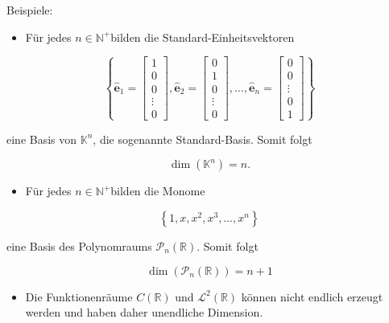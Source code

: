 \documentclass[10pt]{article}
\begin{document}
Beispiele:

\begin{itemize}
  \item Für jedes $n \in \mathbb{N}^{+}$bilden die Standard-Einheitsvektoren
\end{itemize}

\[
\left\{\hat{\mathbf{e}}_{1}=\left[\begin{array}{c}
1  \tag{7.23}\\
0 \\
0 \\
\vdots \\
0
\end{array}\right], \hat{\mathbf{e}}_{2}=\left[\begin{array}{c}
0 \\
1 \\
0 \\
\vdots \\
0
\end{array}\right], \ldots, \hat{\mathbf{e}}_{n}=\left[\begin{array}{c}
0 \\
0 \\
\vdots \\
0 \\
1
\end{array}\right]\right\}
\]

eine Basis von $\mathbb{K}^{n}$, die sogenannte Standard-Basis. Somit folgt


\begin{equation*}
\operatorname{dim}\left(\mathbb{K}^{n}\right)=n . \tag{7.24}
\end{equation*}


\begin{itemize}
  \item Für jedes $n \in \mathbb{N}^{+}$bilden die Monome
\end{itemize}


\begin{equation*}
\left\{1, x, x^{2}, x^{3}, \ldots, x^{n}\right\} \tag{7.25}
\end{equation*}


eine Basis des Polynomraums $\mathcal{P}_{n}(\mathbb{R})$. Somit folgt


\begin{equation*}
\operatorname{dim}\left(\mathcal{P}_{n}(\mathbb{R})\right)=n+1 \tag{7.26}
\end{equation*}


\begin{itemize}
  \item Die Funktionenräume $C(\mathbb{R})$ und $\mathcal{L}^{2}(\mathbb{R})$ können nicht endlich erzeugt werden und haben daher unendliche Dimension.
\end{itemize}
\end{document}
